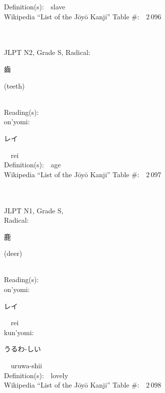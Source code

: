 \begin{multicols}{2}
Definition(s):\ \ slave \\
Wikipedia ``List of the J\=oy\=o Kanji'' Table \#:\ \ 2\,096 \\
\ \ \\
{\fontsize{34pt}{40pt}  }\ \ \\  %
{JLPT N2, Grade S, Radical:\ \ {\begin{CJK}{UTF8}{min} 齒 \end{CJK}} (teeth) } \\
Reading(s):\ \ \\
{\hspace*{1em}}on'yomi:\ \ \\
{\hspace*{2em}}{\begin{CJK}{UTF8}{min} レイ \end{CJK}}\ \ rei\ \ \\
Definition(s):\ \ age \\
Wikipedia ``List of the J\=oy\=o Kanji'' Table \#:\ \ 2\,097 \\
\ \ \\
{\fontsize{34pt}{40pt}  }\ \ \\
{JLPT N1, Grade S, \\Radical:\ \ {\begin{CJK}{UTF8}{min} 鹿 \end{CJK}} (deer) } \\
Reading(s):\ \ \\
{\hspace*{1em}}on'yomi:\ \ \\
{\hspace*{2em}}{\begin{CJK}{UTF8}{min} レイ \end{CJK}}\ \ rei\ \ \\
{\hspace*{1em}}kun'yomi:\ \ \\
{\hspace*{2em}}{\begin{CJK}{UTF8}{min} うるわ-しい \end{CJK}}\ \ uruwa-shii\ \ \\
Definition(s):\ \ lovely \\
Wikipedia ``List of the J\=oy\=o Kanji'' Table \#:\ \ 2\,098 \\

\end{multicols}
